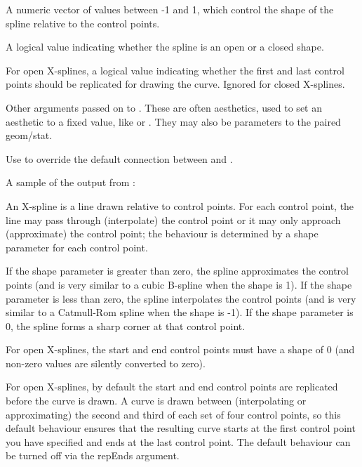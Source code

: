 \documentclass[a4paper]{book}
\begin{document}
\begin{Arguments}
\begin{ldescription}
\item[\code{spline\_shape}] A numeric vector of values between -1 and 1, which
control the shape of the spline relative to the control points.

\item[\code{open}] A logical value indicating whether the spline is an open or a
closed shape.

\item[\code{rep\_ends}] For open X-splines, a logical value indicating whether the
first and last control points should be replicated for drawing the
curve. Ignored for closed X-splines.

\item[\code{...}] Other arguments passed on to . These are
often aesthetics, used to set an aesthetic to a fixed value, like
 or . They may also be parameters
to the paired geom/stat.

\item[\code{geom}, \code{stat}] Use to override the default connection between
 and .
\end{ldescription}
\end{Arguments}
%
\begin{Details}



A sample of the output from :




An X-spline is a line drawn relative to control points. For each control
point, the line may pass through (interpolate) the control point or it may
only approach (approximate) the control point; the behaviour is determined
by a shape parameter for each control point.

If the shape parameter is greater than zero, the spline approximates the
control points (and is very similar to a cubic B-spline when the shape is
1). If the shape parameter is less than zero, the spline interpolates the
control points (and is very similar to a Catmull-Rom spline when the shape
is -1). If the shape parameter is 0, the spline forms a sharp corner at that
control point.

For open X-splines, the start and end control points must have a shape of
0 (and non-zero values are silently converted to zero).

For open X-splines, by default the start and end control points are
replicated before the curve is drawn. A curve is drawn between (interpolating
or approximating) the second and third of each set of four control points,
so this default behaviour ensures that the resulting curve starts at the
first control point you have specified and ends at the last control point.
The default behaviour can be turned off via the repEnds argument.
\end{Details}
\end{document}
